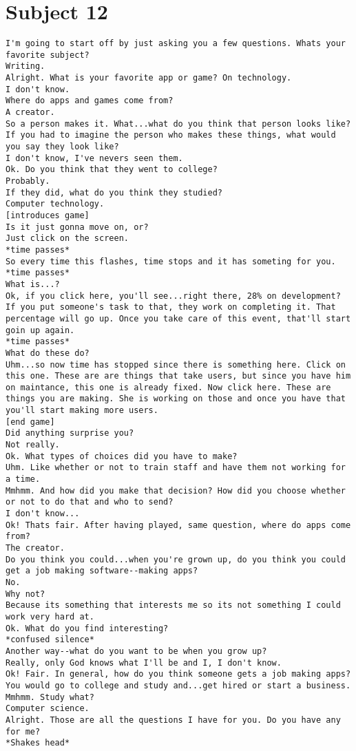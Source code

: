 \clearpage\section*{Subject 12}
\begin{lstlisting}
I'm going to start off by just asking you a few questions. Whats your favorite subject?
Writing.
Alright. What is your favorite app or game? On technology.
I don't know.
Where do apps and games come from?
A creator.
So a person makes it. What...what do you think that person looks like? If you had to imagine the person who makes these things, what would you say they look like?
I don't know, I've nevers seen them.
Ok. Do you think that they went to college?
Probably.
If they did, what do you think they studied?
Computer technology.
[introduces game]
Is it just gonna move on, or?
Just click on the screen.
*time passes*
So every time this flashes, time stops and it has someting for you.
*time passes*
What is...?
Ok, if you click here, you'll see...right there, 28% on development? If you put someone's task to that, they work on completing it. That percentage will go up. Once you take care of this event, that'll start goin up again.
*time passes*
What do these do?
Uhm...so now time has stopped since there is something here. Click on this one. These are are things that take users, but since you have him on maintance, this one is already fixed. Now click here. These are things you are making. She is working on those and once you have that you'll start making more users.
[end game]
Did anything surprise you?
Not really.
Ok. What types of choices did you have to make?
Uhm. Like whether or not to train staff and have them not working for a time.
Mmhmm. And how did you make that decision? How did you choose whether or not to do that and who to send?
I don't know...
Ok! Thats fair. After having played, same question, where do apps come from?
The creator.
Do you think you could...when you're grown up, do you think you could get a job making software--making apps?
No.
Why not?
Because its something that interests me so its not something I could work very hard at.
Ok. What do you find interesting?
*confused silence*
Another way--what do you want to be when you grow up?
Really, only God knows what I'll be and I, I don't know.
Ok! Fair. In general, how do you think someone gets a job making apps?
You would go to college and study and...get hired or start a business.
Mmhmm. Study what?
Computer science.
Alright. Those are all the questions I have for you. Do you have any for me?
*Shakes head*
\end{lstlisting}

